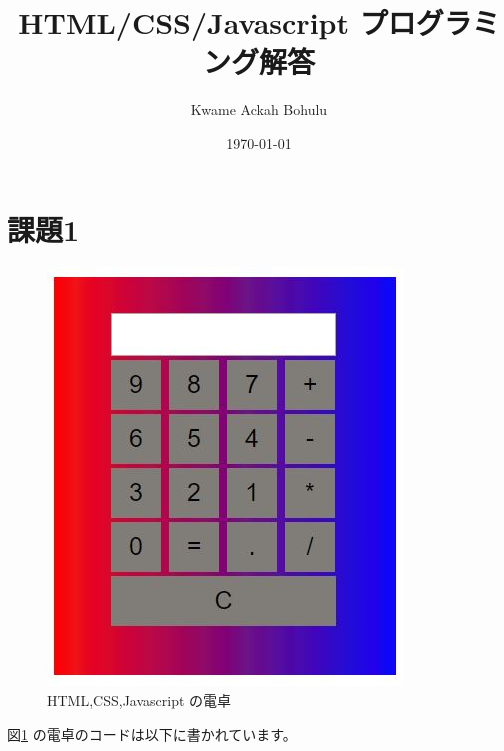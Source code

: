 \documentclass[fontsize=12pt]{article}
\title{HTML/CSS/Javascript
プログラミング解答 }
\author{Kwame Ackah Bohulu}
\date{\today}
\begin{document}
\maketitle

\newpage
\section{課題1}

\begin{figure}[h!]
  \includegraphics[width=0.5\linewidth]{calculator.jpg}
  \caption{HTML,CSS,Javascript の電卓}
  \label{fig1}
\end{figure}
図\ref{fig1} の電卓のコードは以下に書かれています。
\end{document}
